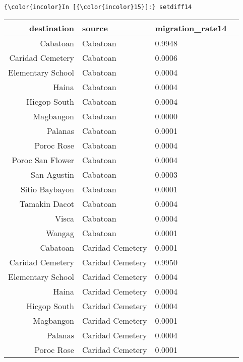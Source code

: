 \documentclass[11pt]{article}
\begin{document}
    \begin{Verbatim}[commandchars=\\\{\}]
{\color{incolor}In [{\color{incolor}15}]:} setdiff14
\end{Verbatim}


    \begin{tabular}{r|lll}
 destination & source & migration\_rate14\\
\hline
	 Cabatoan          & Cabatoan          & 0.9948           \\
	 Caridad Cemetery  & Cabatoan          & 0.0006           \\
	 Elementary School & Cabatoan          & 0.0004           \\
	 Haina             & Cabatoan          & 0.0004           \\
	 Hicgop South      & Cabatoan          & 0.0004           \\
	 Magbangon         & Cabatoan          & 0.0000           \\
	 Palanas           & Cabatoan          & 0.0001           \\
	 Poroc Rose        & Cabatoan          & 0.0004           \\
	 Poroc San Flower  & Cabatoan          & 0.0004           \\
	 San Agustin       & Cabatoan          & 0.0003           \\
	 Sitio Baybayon    & Cabatoan          & 0.0001           \\
	 Tamakin Dacot     & Cabatoan          & 0.0004           \\
	 Visca             & Cabatoan          & 0.0004           \\
	 Wangag            & Cabatoan          & 0.0001           \\
	 Cabatoan          & Caridad Cemetery  & 0.0001           \\
	 Caridad Cemetery  & Caridad Cemetery  & 0.9950           \\
	 Elementary School & Caridad Cemetery  & 0.0004           \\
	 Haina             & Caridad Cemetery  & 0.0004           \\
	 Hicgop South      & Caridad Cemetery  & 0.0004           \\
	 Magbangon         & Caridad Cemetery  & 0.0001           \\
	 Palanas           & Caridad Cemetery  & 0.0004           \\
	 Poroc Rose        & Caridad Cemetery  & 0.0001           \\

\end{tabular}
\end{document}
